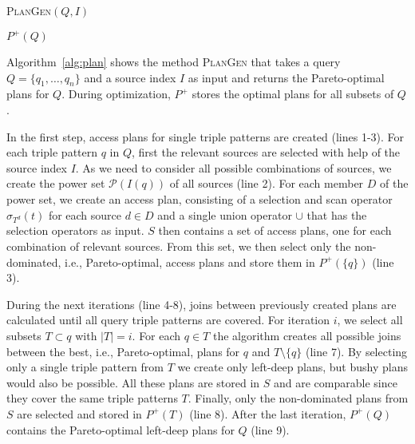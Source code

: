 \begin{algorithm}
  \label{alg:plan}
  \DontPrintSemicolon

  \caption{\textsc{PlanGen}$(Q,I)$}


  \Return $P^+(Q)$
\end{algorithm}

Algorithm~\ref{alg:plan} shows the method \textsc{PlanGen} that takes
a query $Q=\{q_1,\ldots,q_n\}$ and a source index $I$ as input and
returns the Pareto-optimal plans for $Q$. During optimization, $P^+$
stores the optimal plans for all subsets of $Q$.

In the first step, access plans for single triple patterns are created
(lines 1-3). For each triple pattern $q$ in $Q$, first the relevant
sources are selected with help of the source index $I$. As we need to
consider all possible combinations of sources, we create the power set
$\mathcal{P}(I(q))$ of all sources (line 2). For each member $D$ of
the power set, we create an access plan, consisting of a selection and
scan operator $\sigma_{T^d}(t)$ for each source $d \in D$ and a
single union operator $\cup$ that has the selection operators as
input. $S$ then contains a set of access plans, one for each
combination of relevant sources. From this set, we then select only
the non-dominated, i.e., Pareto-optimal, access plans and store them
in $P^+(\{q\})$ (line 3).

During the next iterations (line 4-8), joins between previously
created plans are calculated until all query triple patterns are
covered. For iteration $i$, we select all subsets $T \subset q$ with
$|T|=i$. For each $q \in T$ the algorithm creates all possible joins
between the best, i.e., Pareto-optimal, plans for $q$ and $T\setminus
\{q\}$ (line 7). By selecting only a single triple pattern from $T$ we
create only left-deep plans, but bushy plans would also be possible.
All these plans are stored in $S$ and are comparable since they cover
the same triple patterns $T$. Finally, only the non-dominated plans
from $S$ are selected and stored in $P^+(T)$ (line 8). After the last
iteration, $P^+(Q)$ contains the Pareto-optimal left-deep plans for
$Q$ (line 9).

